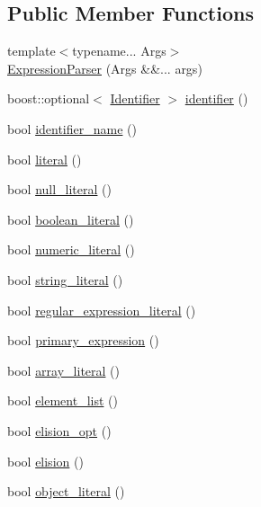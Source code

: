 \subsection*{Public Member Functions}
\begin{DoxyCompactItemize}
\item 
{\footnotesize template$<$typename... Args$>$ }\\\hyperlink{class_expression_parser_a8a408e6f468f529013d43579007e19ea}{Expression\+Parser} (Args \&\&... args)
\item 
boost\+::optional$<$ \hyperlink{struct_identifier}{Identifier} $>$ \hyperlink{class_expression_parser_a9855435adf0e19f757bb0620d0b209b2}{identifier} ()
\item 
bool \hyperlink{class_expression_parser_aa662f70d022ed5920c05e511c0fa8ad2}{identifier\+\_\+name} ()
\item 
bool \hyperlink{class_expression_parser_a3493321a9e1230a5e7131e5dceba48e9}{literal} ()
\item 
bool \hyperlink{class_expression_parser_a61a591abe549ed1cf5d314a289995738}{null\+\_\+literal} ()
\item 
bool \hyperlink{class_expression_parser_aaa6269db9ae768564446a118698ffc85}{boolean\+\_\+literal} ()
\item 
bool \hyperlink{class_expression_parser_afef0be5de39bb73b1893a6d02aa9113f}{numeric\+\_\+literal} ()
\item 
bool \hyperlink{class_expression_parser_a7595a47d989cc56d4e3decd5c126dde3}{string\+\_\+literal} ()
\item 
bool \hyperlink{class_expression_parser_a2b97b688fe19173c803d3ea0fc5d0b07}{regular\+\_\+expression\+\_\+literal} ()
\item 
bool \hyperlink{class_expression_parser_a6cabeb6ac4ded234822f1c071bb42733}{primary\+\_\+expression} ()
\item 
bool \hyperlink{class_expression_parser_a72be7e541106a3c46269e6fd993c3750}{array\+\_\+literal} ()
\item 
bool \hyperlink{class_expression_parser_a848836ebcedb78302ec6ed89f7133155}{element\+\_\+list} ()
\item 
bool \hyperlink{class_expression_parser_a9e75623feb3846758c34a75d4f47f582}{elision\+\_\+opt} ()
\item 
bool \hyperlink{class_expression_parser_a0cad8aa1c382236663200bb605b1be11}{elision} ()
\item 
bool \hyperlink{class_expression_parser_a9d2a524324d8c40d593147c0b484115d}{object\+\_\+literal} ()

\end{DoxyCompactItemize}
